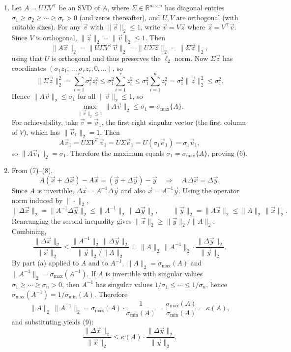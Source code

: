 \documentclass[
  12pt,
]{fphw}
\begin{document}
\begin{enumerate}
\item[(a)] Let $A = U\Sigma V^\top$ be an SVD of $A$, where $\Sigma\in\mathbb{R}^{m\times n}$ has diagonal entries
$\sigma_1\ge \sigma_2\ge \cdots \ge \sigma_r > 0$ (and zeros thereafter), and $U,V$ are orthogonal (with suitable sizes).
For any $\vec v$ with $\|\vec v\|_2\le 1$, write $\vec v = V\vec z$ where $\vec z = V^\top \vec v$.
Since $V$ is orthogonal, $\|\vec z\|_2 = \|\vec v\|_2 \le 1$. Then
\[
\|A\vec v\|_2
= \|U\Sigma V^\top \vec v\|_2
= \|U\Sigma \vec z\|_2
= \|\Sigma \vec z\|_2,
\]
using that $U$ is orthogonal and thus preserves the $\ell_2$ norm.
Now $\Sigma \vec z$ has coordinates $(\sigma_1 z_1,\ldots,\sigma_r z_r, 0,\ldots)$, so
\[
\|\Sigma \vec z\|_2^2
= \sum_{i=1}^r \sigma_i^2 z_i^2
\le \sigma_1^2 \sum_{i=1}^r z_i^2
\le \sigma_1^2 \sum_{i=1}^n z_i^2
= \sigma_1^2 \|\vec z\|_2^2
\le \sigma_1^2.
\]
Hence $\|A\vec v\|_2 \le \sigma_1$ for all $\|\vec v\|_2\le 1$, so
\[
\max_{\|\vec v\|_2\le 1}\|A\vec v\|_2 \le \sigma_1 = \sigma_{\max}\{A\}.
\]
For achievability, take $\vec v = \vec v_1$, the first right singular vector (the first column of $V$), which has
$\|\vec v_1\|_2=1$. Then
\[
A\vec v_1 = U\Sigma V^\top \vec v_1 = U\Sigma \vec e_1 = U(\sigma_1 \vec e_1) = \sigma_1 \vec u_1,
\]
so $\|A\vec v_1\|_2 = \sigma_1$. Therefore the maximum equals $\sigma_1=\sigma_{\max}\{A\}$, proving (6).

\item[(b)] From (7)--(8),
\[
A(\vec x+\Delta \vec x) - A\vec x = (\vec y+\Delta \vec y) - \vec y
\quad\Longrightarrow\quad
A\,\Delta \vec x = \Delta \vec y.
\]
Since $A$ is invertible, $\Delta \vec x = A^{-1}\Delta \vec y$ and also $\vec x = A^{-1}\vec y$.
Using the operator norm induced by $\|\cdot\|_2$,
\[
\|\Delta \vec x\|_2 = \|A^{-1}\Delta \vec y\|_2 \le \|A^{-1}\|_2 \,\|\Delta \vec y\|_2,
\qquad
\|\vec y\|_2 = \|A\vec x\|_2 \le \|A\|_2\,\|\vec x\|_2.
\]
Rearranging the second inequality gives $\|\vec x\|_2 \ge \|\vec y\|_2/\|A\|_2$. Combining,
\[
\frac{\|\Delta \vec x\|_2}{\|\vec x\|_2}
\le
\frac{\|A^{-1}\|_2\,\|\Delta \vec y\|_2}{\|\vec y\|_2/\|A\|_2}
=
\|A\|_2\,\|A^{-1}\|_2 \cdot \frac{\|\Delta \vec y\|_2}{\|\vec y\|_2}.
\]
By part (a) applied to $A$ and to $A^{-1}$, $\|A\|_2=\sigma_{\max}(A)$ and $\|A^{-1}\|_2=\sigma_{\max}(A^{-1})$.
If $A$ is invertible with singular values $\sigma_1\ge\cdots\ge\sigma_n>0$, then $A^{-1}$ has singular values
$1/\sigma_1\le\cdots\le 1/\sigma_n$, hence $\sigma_{\max}(A^{-1}) = 1/\sigma_{\min}(A)$.
Therefore
\[
\|A\|_2\,\|A^{-1}\|_2
=
\sigma_{\max}(A)\cdot \frac{1}{\sigma_{\min}(A)}
=
\frac{\sigma_{\max}(A)}{\sigma_{\min}(A)}
=
\kappa(A),
\]
and substituting yields (9):
\[
\frac{\|\Delta \vec x\|_2}{\|\vec x\|_2}
\le \kappa(A)\cdot \frac{\|\Delta \vec y\|_2}{\|\vec y\|_2}.
\]
\end{enumerate}
\end{document}
